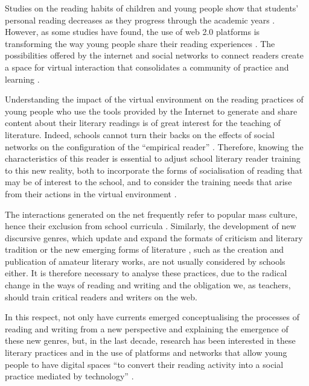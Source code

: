 \documentclass[english]{textolivre}
\begin{document}
Studies on the reading habits of children and young people show that students’ personal reading decreases as they progress through the academic years \cite{gonzalez2017habitos, valdes2018}. However, as some studies have found, the use of web 2.0 platforms is transforming the way young people share their reading experiences \cite{garcia2015leer, travancas2014juventud}. The possibilities offered by the internet and social networks to connect readers create a space for virtual interaction that consolidates a community of practice and learning \cite{paladines-paredes_canales_2020}.

Understanding the impact of the virtual environment on the reading practices of young people who use the tools provided by the Internet to generate and share content about their literary readings is of great interest for the teaching of literature. Indeed, schools cannot turn their backs on the effects of social networks on the configuration of the “empirical reader” \cite{bombini2006practicas}. Therefore, knowing the characteristics of this reader is essential to adjust school literary reader training to this new reality, both to incorporate the forms of socialisation of reading that may be of interest to the school, and to consider the training needs that arise from their actions in the virtual environment \cite{manresa_practicas_2016}.

The interactions generated on the net frequently refer to popular mass culture, hence their exclusion from school curricula \cite{torrego_gonzalez_practicas_2021}. Similarly, the development of new discursive genres, which update and expand the formats of criticism and literary tradition \cite{paladines-paredes_booktubers:_2021b} or the new emerging forms of literature \cite{abdad_ruiz_fanfiction:_2011}, such as the creation and publication of amateur literary works, are not usually considered by schools either. It is therefore necessary to analyse these practices, due to the radical change in the ways of reading and writing and the obligation we, as teachers, should train critical readers and writers on the web.

In this respect, not only have currents emerged conceptualising the processes of reading and writing from a new perspective and explaining the emergence of these new genres, but, in the last decade, research has been interested in these literary practices and in the use of platforms and networks that allow young people to have digital spaces “to convert their reading activity into a social practice mediated by technology” \cite[p. 60]{paladines-paredes_booktubers:_2021b}.  
\end{document}

